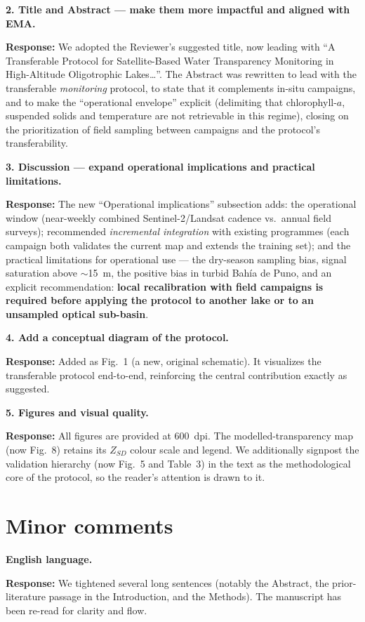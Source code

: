 \documentclass[11pt]{article}
\newcommand{\resp}[1]{\par\noindent\textcolor{blue!60!black}{\textbf{Response:}} #1\par\medskip}
\begin{document}
\textbf{2. Title and Abstract --- make them more impactful and aligned with EMA.}
\resp{We adopted the Reviewer's suggested title, now leading with ``A Transferable
Protocol for Satellite-Based Water Transparency Monitoring in High-Altitude
Oligotrophic Lakes\ldots''. The Abstract was rewritten to lead with the transferable
\emph{monitoring} protocol, to state that it complements in-situ campaigns, and to
make the ``operational envelope'' explicit (delimiting that chlorophyll-$a$,
suspended solids and temperature are not retrievable in this regime), closing on the
prioritization of field sampling between campaigns and the protocol's
transferability.}

\textbf{3. Discussion --- expand operational implications and practical
limitations.}
\resp{The new ``Operational implications'' subsection adds: the operational window
(near-weekly combined Sentinel-2/Landsat cadence vs.\ annual field surveys);
recommended \emph{incremental integration} with existing programmes (each campaign
both validates the current map and extends the training set); and the practical
limitations for operational use --- the dry-season sampling bias, signal saturation
above $\sim$15~m, the positive bias in turbid Bah\'ia de Puno, and an explicit
recommendation: \textbf{local recalibration with field campaigns is required before
applying the protocol to another lake or to an unsampled optical sub-basin}.}

\textbf{4. Add a conceptual diagram of the protocol.}
\resp{Added as Fig.~1 (a new, original schematic). It visualizes the transferable
protocol end-to-end, reinforcing the central contribution exactly as suggested.}

\textbf{5. Figures and visual quality.}
\resp{All figures are provided at 600~dpi. The modelled-transparency map (now
Fig.~8) retains its $Z_{SD}$ colour scale and legend. We additionally signpost the
validation hierarchy (now Fig.~5 and Table~3) in the text as the methodological
core of the protocol, so the reader's attention is drawn to it.}

\section*{Minor comments}

\textbf{English language.}
\resp{We tightened several long sentences (notably the Abstract, the prior-literature
passage in the Introduction, and the Methods). The manuscript has been re-read for
clarity and flow.}
\end{document}
